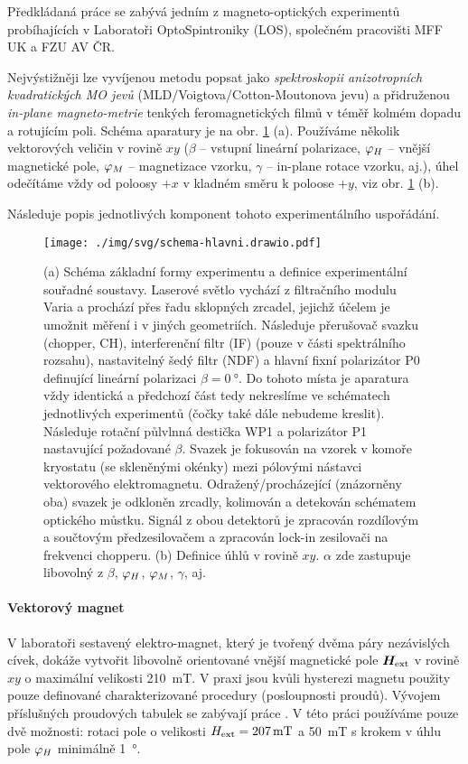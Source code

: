 Předkládaná práce se zabývá jedním z magneto-optických experimentů probíhajících v Laboratoři OptoSpintroniky (LOS), společném pra\-co\-viš\-ti MFF UK a FZU AV ČR.

Nejvýstižněji lze vyvíjenou metodu popsat jako \emph{spektroskopii anizotropních kvadratických MO jevů} (MLD/Voigtova/Cotton-Moutonova jevu) a přidruženou \emph{in-plane magneto-metrie} tenkých feromagnetických filmů v téměř kolmém dopadu a rotujícím poli.
Schéma aparatury je na obr. \ref{fig:zakladni-schema} (a).
Používáme několik vektorových veličin v rovině $xy$ ($\beta$ -- vstupní lineární polarizace, $\varphi_H$ -- vnější magnetické pole, $\varphi_M$ -- magnetizace vzorku, $\gamma$ -- in-plane rotace vzorku, aj.), úhel odečítáme vždy od poloosy $+x$ v kladném směru k poloose $+y$, viz obr. \ref{fig:zakladni-schema} (b).

Následuje popis jednotlivých komponent tohoto experimentálního uspořádání.

\begin{figure}[htbp]
    \centering
    \texttt{[image: ./img/svg/schema-hlavni.drawio.pdf]}
    \caption{(a) Schéma základní formy experimentu a definice experimentální souřadné soustavy.
    Laserové světlo vychází z filtračního modulu Varia a prochází přes řadu sklopných zrcadel, jejichž účelem je umožnit měření i v jiných geometriích.
Následuje přerušovač svazku (chopper, CH), interferenční filtr (IF) (pouze v části spektrálního rozsahu), nastavitelný šedý filtr (NDF) a hlavní fixní polarizátor P0 definující lineární polarizaci $\beta=\SI{0}{\degree}$.
Do tohoto místa je aparatura vždy identická a předchozí část tedy nekreslíme ve schématech jednotlivých experimentů (čočky také dále nebudeme kreslit).
Následuje rotační půlvlnná destička WP1 a polarizátor P1 nastavující požadované $\beta$.
Svazek je fokusován na vzorek v komoře kryostatu (se skleněnými okénky) mezi pólovými nástavci vektorového elektromagnetu.
Odražený/procházející (znázorněny oba) svazek je odkloněn zrcadly, kolimován a detekován schématem optického můstku.
Signál z obou detektorů je zpracován rozdílovým a součtovým předzesilovačem a zpracován lock-in zesilovači na frekvenci chopperu.
(b) Definice úhlů v rovině $xy$. $\alpha$ zde zastupuje libovolný z $\beta$, $\varphi_H$, $\varphi_M$, $\gamma$, aj.}
    \label{fig:zakladni-schema}
\end{figure}

\paragraph{Vektorový magnet}
V laboratoři sestavený elektro-magnet, který je tvořený dvěma páry nezávislých cívek, dokáže vytvořit libovolně orientované vnější magnetické pole $\bm{H}_\textrm{ext}$ v rovině $xy$ o maximální velikosti \SI{210}{\milli\tesla}.
V praxi jsou kvůli hysterezi magnetu použity pouze definované charakterizované procedury (posloupnosti proudů).
Vývojem příslušných proudových tabulek se zabývají práce \cite{kimakCharakterizaciaDvojdimenzionalnehoElektromagnetu2017,kimakOptickaSpektroskopieAntiferomagnetu2019}.
V této práci používáme pouze dvě možnosti: rotaci pole o velikosti $H_\textrm{ext}=\SI{207}{\milli\tesla}$ a \SI{50}{\milli\tesla} s krokem v úhlu pole $\varphi_H$ minimálně \SI{1}{\degree}.

